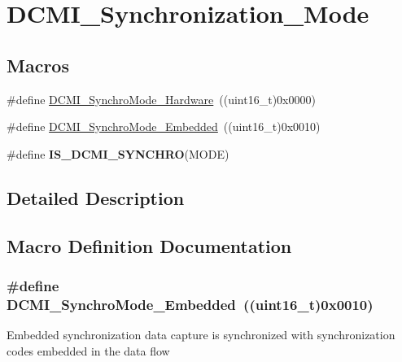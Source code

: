 \hypertarget{group___d_c_m_i___synchronization___mode}{}\section{D\+C\+M\+I\+\_\+\+Synchronization\+\_\+\+Mode}
\label{group___d_c_m_i___synchronization___mode}
\subsection*{Macros}
\begin{DoxyCompactItemize}
\item 
\#define \hyperlink{group___d_c_m_i___synchronization___mode_ga03d983bb911952d7f84783d5999a9559}{D\+C\+M\+I\+\_\+\+Synchro\+Mode\+\_\+\+Hardware}~((uint16\+\_\+t)0x0000)
\item 
\#define \hyperlink{group___d_c_m_i___synchronization___mode_ga66d71596091ae2a6273100ffa50334d0}{D\+C\+M\+I\+\_\+\+Synchro\+Mode\+\_\+\+Embedded}~((uint16\+\_\+t)0x0010)
\item 
\#define {\bfseries I\+S\+\_\+\+D\+C\+M\+I\+\_\+\+S\+Y\+N\+C\+H\+R\+O}(M\+O\+D\+E)
\end{DoxyCompactItemize}


\subsection{Detailed Description}


\subsection{Macro Definition Documentation}
\hypertarget{group___d_c_m_i___synchronization___mode_ga66d71596091ae2a6273100ffa50334d0}{}
\subsubsection[{D\+C\+M\+I\+\_\+\+Synchro\+Mode\+\_\+\+Embedded}]{\setlength{\rightskip}{0pt plus 5cm}\#define D\+C\+M\+I\+\_\+\+Synchro\+Mode\+\_\+\+Embedded~((uint16\+\_\+t)0x0010)}\label{group___d_c_m_i___synchronization___mode_ga66d71596091ae2a6273100ffa50334d0}
Embedded synchronization data capture is synchronized with synchronization codes embedded in the data flow \hypertarget{group___d_c_m_i___synchronization___mode_ga03d983bb911952d7f84783d5999a9559}{}
